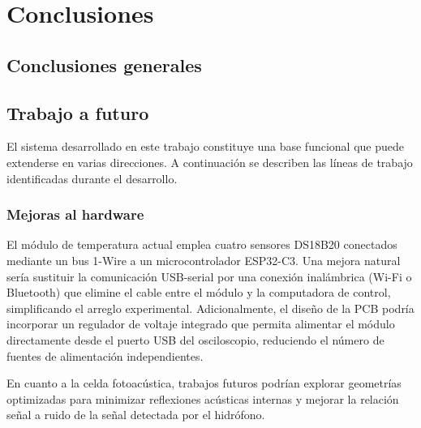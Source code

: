 \chapter{Conclusiones}
\label{cap:conclusiones}

\section{Conclusiones generales}
\label{sec:conclusiones_generales}


\section{Trabajo a futuro}
\label{sec:trabajo_futuro}

El sistema desarrollado en este trabajo constituye una base funcional
que puede extenderse en varias direcciones. A continuación se describen
las líneas de trabajo identificadas durante el desarrollo.

\subsection*{Mejoras al hardware}

El módulo de temperatura actual emplea cuatro sensores DS18B20
conectados mediante un bus 1-Wire a un microcontrolador ESP32-C3.
Una mejora natural sería sustituir la comunicación USB-serial por
una conexión inalámbrica (Wi-Fi o Bluetooth) que elimine el cable
entre el módulo y la computadora de control, simplificando el
arreglo experimental. Adicionalmente, el diseño de la PCB podría
incorporar un regulador de voltaje integrado que permita alimentar
el módulo directamente desde el puerto USB del osciloscopio,
reduciendo el número de fuentes de alimentación independientes.

En cuanto a la celda fotoacústica, trabajos futuros podrían explorar
geometrías optimizadas para minimizar reflexiones acústicas internas
y mejorar la relación señal a ruido de la señal detectada por el
hidrófono.

